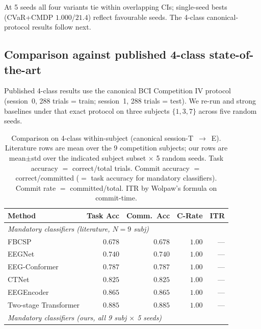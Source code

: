 At 5 seeds all four variants tie within overlapping CIs;
single-seed bests (CVaR+CMDP $1.000$/$21.4$) reflect favourable
seeds. The 4-class \bcia{} canonical-protocol results follow next.

\subsection{Comparison against published \bcia{} 4-class state-of-the-art}\label{sec:results:sota}

Published \bcia{} 4-class results use the canonical BCI
Competition IV protocol (session~0, 288 trials = train; session~1,
288 trials = test). We re-run \nettype{} and strong baselines
under that exact protocol on three subjects $\{1, 3, 7\}$ across
five random seeds.

\begin{table}[!htbp]
\centering
\caption{Comparison on \bcia{} 4-class within-subject (canonical
session-T~$\to$~E). Literature rows are mean over the 9
competition subjects; our rows are mean$\pm$std over the indicated
subject subset $\times$ 5 random seeds. Task accuracy $=$
correct/total trials. Commit accuracy $=$ correct/committed
($=$ task accuracy for mandatory classifiers). Commit rate $=$
committed/total. ITR by Wolpaw's formula on commit-time.}
\label{tab:sota}
\footnotesize
\setlength{\tabcolsep}{6pt}
\begin{tabular}{l r r r r}
\toprule
Method & Task Acc & Comm.~Acc & C-Rate & ITR \\
\midrule
\multicolumn{5}{l}{\textit{Mandatory classifiers (literature, $N\!=\!9$ subj)}} \\
FBCSP \cite{Ang2012FBCSPFrontiers}                    & $0.678$ & $0.678$ & $1.00$ & --- \\
EEGNet \cite{Lawhern2018}                              & $0.740$ & $0.740$ & $1.00$ & --- \\
EEG-Conformer \cite{Song2023Conformer}                & $0.787$ & $0.787$ & $1.00$ & --- \\
CTNet \cite{Zhao2024CTNet}                            & $0.825$ & $0.825$ & $1.00$ & --- \\
EEGEncoder \cite{Liao2025EEGEncoder}                  & $0.865$ & $0.865$ & $1.00$ & --- \\
Two-stage Transformer \cite{Chaudhary2024TwoStageMI}  & $0.885$ & $0.885$ & $1.00$ & --- \\
\midrule
\multicolumn{5}{l}{\textit{Mandatory classifiers (ours, all 9 subj $\times$ 5 seeds)}} \\

\end{tabular}
\end{table}

